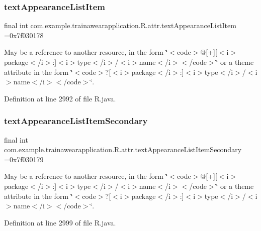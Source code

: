 \subsubsection{\texorpdfstring{textAppearanceListItem}{textAppearanceListItem}}
{\footnotesize\ttfamily final int com.\+example.\+trainawearapplication.\+R.\+attr.\+text\+Appearance\+List\+Item =0x7f030178\hspace{0.3cm}{\ttfamily [static]}}

May be a reference to another resource, in the form \char`\"{}$<$code$>$@\mbox{[}+\mbox{]}\mbox{[}$<$i$>$package$<$/i$>$\+:\mbox{]}$<$i$>$type$<$/i$>$/$<$i$>$name$<$/i$>$$<$/code$>$\char`\"{} or a theme attribute in the form \char`\"{}$<$code$>$?\mbox{[}$<$i$>$package$<$/i$>$\+:\mbox{]}$<$i$>$type$<$/i$>$/$<$i$>$name$<$/i$>$$<$/code$>$\char`\"{}. 

Definition at line 2992 of file R.\+java.

\mbox{\label{classcom_1_1example_1_1trainawearapplication_1_1_r_1_1attr_a5f56fa296b9667a53d673a89bce08c86}} 
\subsubsection{\texorpdfstring{textAppearanceListItemSecondary}{textAppearanceListItemSecondary}}
{\footnotesize\ttfamily final int com.\+example.\+trainawearapplication.\+R.\+attr.\+text\+Appearance\+List\+Item\+Secondary =0x7f030179\hspace{0.3cm}{\ttfamily [static]}}

May be a reference to another resource, in the form \char`\"{}$<$code$>$@\mbox{[}+\mbox{]}\mbox{[}$<$i$>$package$<$/i$>$\+:\mbox{]}$<$i$>$type$<$/i$>$/$<$i$>$name$<$/i$>$$<$/code$>$\char`\"{} or a theme attribute in the form \char`\"{}$<$code$>$?\mbox{[}$<$i$>$package$<$/i$>$\+:\mbox{]}$<$i$>$type$<$/i$>$/$<$i$>$name$<$/i$>$$<$/code$>$\char`\"{}. 

Definition at line 2999 of file R.\+java.

\mbox{\label{classcom_1_1example_1_1trainawearapplication_1_1_r_1_1attr_af6cd8bc5bbab68ceb847067da5b4be02}} 
